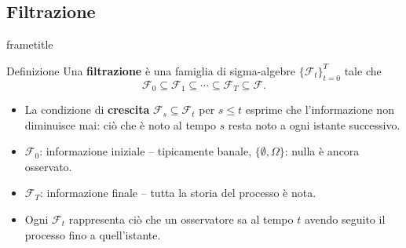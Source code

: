 \documentclass[handout]{beamer}
\newenvironment{stepitemize}{\begin{itemize}[<+->]}{\end{itemize}}
\providecommand{\QTR}[2]{\csname #1\endcsname{#2}}
\begin{document}

\subsection{Filtrazione}

\begin{frame}%

\QTR{frametitle}{Filtrazione}

%

\begin{block}{Definizione}
Una \textbf{filtrazione} \`{e} una famiglia di sigma-algebre
$\{\mathcal{F}_t\}_{t=0}^T$ tale che
\[
\mathcal{F}_0 \subseteq \mathcal{F}_1 \subseteq \cdots
\subseteq \mathcal{F}_T \subseteq \mathcal{F}.
\]
\end{block}

\medskip

\begin{stepitemize}

\item La condizione di \textbf{crescita} $\mathcal{F}_s \subseteq
\mathcal{F}_t$ per $s \leq t$ esprime che l'informazione non
diminuisce mai: ci\`{o} che \`{e} noto al tempo $s$ resta noto
a ogni istante successivo.

\item $\mathcal{F}_0$: informazione iniziale -- tipicamente
banale, $\{\emptyset, \Omega\}$: nulla \`{e} ancora osservato.

\item $\mathcal{F}_T$: informazione finale -- tutta la storia
del processo \`{e} nota.

\item Ogni $\mathcal{F}_t$ rappresenta ci\`{o} che un osservatore
sa al tempo $t$ avendo seguito il processo fino a quell'istante.

\end{stepitemize}

\transboxout
\end{frame}%
\end{document}
